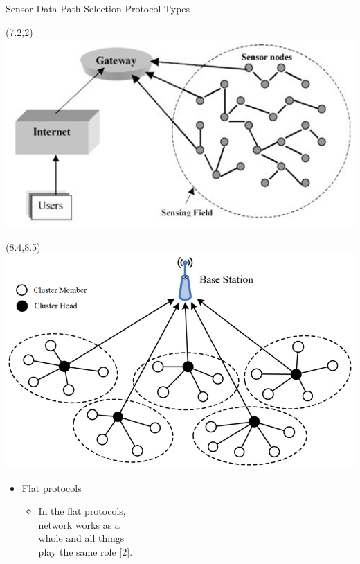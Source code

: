 \documentclass{beamer}
\begin{document}
\begin{frame}[t]{Sensor Data Path Selection Protocol Types} %

\begin{textblock}{0.5}(7.2,2)
\includegraphics[scale=0.5]{figure/Things.png}
\end{textblock}

\begin{textblock}{0.5}(8.4,8.5)
\includegraphics[scale=0.2]{figure/Hierarchical.png}
\end{textblock}


\begin{itemize}
\justifying
\footnotesize

\item Flat protocols

\begin{itemize}
\justifying
\footnotesize
\item In the flat protocols, \\ network works as a \\ whole and all things \\ play the same role [2].
\end{itemize}



\end{itemize}
\end{frame}
\end{document}
